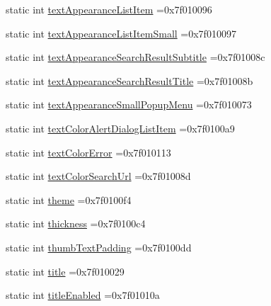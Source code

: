 \begin{DoxyCompactItemize}
\item 
static int \hyperlink{classandroid_1_1support_1_1v7_1_1mediarouter_1_1R_1_1attr_a4baedae190dea72517bc95b649f9703f}{text\+Appearance\+List\+Item} =0x7f010096
\item 
static int \hyperlink{classandroid_1_1support_1_1v7_1_1mediarouter_1_1R_1_1attr_af9ef3c5878f35566f474d773100422af}{text\+Appearance\+List\+Item\+Small} =0x7f010097
\item 
static int \hyperlink{classandroid_1_1support_1_1v7_1_1mediarouter_1_1R_1_1attr_a7b7a74e51788828812a1e02bda2fbdb6}{text\+Appearance\+Search\+Result\+Subtitle} =0x7f01008c
\item 
static int \hyperlink{classandroid_1_1support_1_1v7_1_1mediarouter_1_1R_1_1attr_a7d88573dc917c94b61750b6004b11c70}{text\+Appearance\+Search\+Result\+Title} =0x7f01008b
\item 
static int \hyperlink{classandroid_1_1support_1_1v7_1_1mediarouter_1_1R_1_1attr_a437c1037939e545ae2295c73d465fbd6}{text\+Appearance\+Small\+Popup\+Menu} =0x7f010073
\item 
static int \hyperlink{classandroid_1_1support_1_1v7_1_1mediarouter_1_1R_1_1attr_a3eb66c77f697e2794bfb8078badc18ec}{text\+Color\+Alert\+Dialog\+List\+Item} =0x7f0100a9
\item 
static int \hyperlink{classandroid_1_1support_1_1v7_1_1mediarouter_1_1R_1_1attr_a4bc2751096afde8d80d665c65cd3fff0}{text\+Color\+Error} =0x7f010113
\item 
static int \hyperlink{classandroid_1_1support_1_1v7_1_1mediarouter_1_1R_1_1attr_a45a88a7030b0e2d50130e12bff42e368}{text\+Color\+Search\+Url} =0x7f01008d
\item 
static int \hyperlink{classandroid_1_1support_1_1v7_1_1mediarouter_1_1R_1_1attr_ad067d9f19426f54954ba24757134b5c0}{theme} =0x7f0100f4
\item 
static int \hyperlink{classandroid_1_1support_1_1v7_1_1mediarouter_1_1R_1_1attr_a72390830cb40268bf0727b9d2964518b}{thickness} =0x7f0100c4
\item 
static int \hyperlink{classandroid_1_1support_1_1v7_1_1mediarouter_1_1R_1_1attr_a7468fae21c1543c65b63c2dc30a2d332}{thumb\+Text\+Padding} =0x7f0100dd
\item 
static int \hyperlink{classandroid_1_1support_1_1v7_1_1mediarouter_1_1R_1_1attr_a63e7cf1dd1a79d708a4d99098363d8bd}{title} =0x7f010029
\item 
static int \hyperlink{classandroid_1_1support_1_1v7_1_1mediarouter_1_1R_1_1attr_a3d454b580504f78acb2c462a84d3796a}{title\+Enabled} =0x7f01010a

\end{DoxyCompactItemize}
